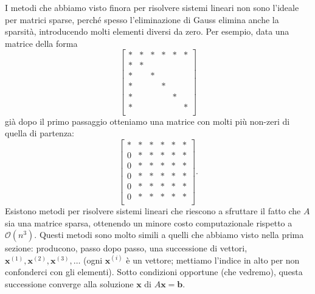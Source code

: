 \documentclass[a4paper]{report}
\theoremstyle{definition}
\theoremstyle{remark}
\newcommand{\x}{\mathbf{x}}
\renewcommand{\b}{\mathbf{b}}
\begin{document}
I metodi che abbiamo visto finora per risolvere sistemi lineari non sono l'ideale per matrici sparse, perché spesso l'eliminazione di Gauss elimina anche la sparsità, introducendo molti elementi diversi da zero. Per esempio, data una matrice della forma
\[
\begin{bmatrix}
    * & * & * & * & * & *\\
    * & * \\
    * & & *\\
    * & & &*\\
    * & & & & *\\
    * & & & & & *\\
\end{bmatrix}
\]
già dopo il primo passaggio otteniamo una matrice con molti più non-zeri di quella di partenza:
\[
\begin{bmatrix}
    * & * & * & * & * & *\\
    0 & * & * & * & * & *\\
    0 & * & * & * & * & *\\
    0 & * & * & * & * & *\\
    0 & * & * & * & * & *\\
    0 & * & * & * & * & *\\
\end{bmatrix}.
\]
Esistono metodi per risolvere sistemi lineari che riescono a sfruttare il fatto che $A$ sia una matrice sparsa, ottenendo un minore costo computazionale rispetto a $\mathcal{O}(n^3)$. Questi metodi sono molto simili a quelli che abbiamo visto nella prima sezione: producono, passo dopo passo, una successione di vettori, $\x^{(1)}, \x^{(2)}, \x^{(3)},\dots$ (ogni $\x^{(i)}$ è un vettore; mettiamo l'indice in alto per non confonderci con gli elementi). Sotto condizioni opportune (che vedremo), questa successione converge alla soluzione $\x$ di $A\x=\b$.
\end{document}
